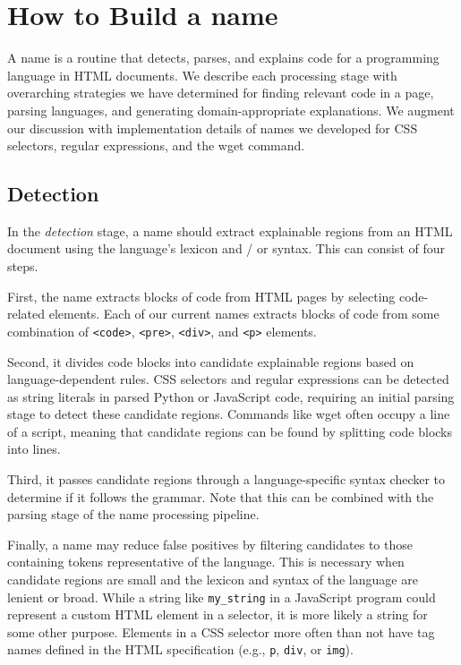 \section{How to Build a \Gls{name}}

A \Gls{name} is a routine that detects, parses, and explains code for a programming language in HTML documents.
We describe each processing stage with overarching strategies we have determined for finding relevant code in a page, parsing languages, and generating domain-appropriate explanations.
We augment our discussion with implementation details of \Glspl{name} we developed for CSS selectors, regular expressions, and the wget command.

\subsection{Detection}
In the \emph{detection} stage, a \Gls{name} should extract explainable regions from an HTML document using the language's lexicon and / or syntax.
This can consist of four steps.

First, the \Gls{name} extracts blocks of code from HTML pages by selecting code-related elements.
Each of our current \Glspl{name} extracts blocks of code from some combination of \texttt{<code>}, \texttt{<pre>}, \texttt{<div>}, and \texttt{<p>} elements.

Second, it divides code blocks into candidate explainable regions based on language-dependent rules.
CSS selectors and regular expressions can be detected as string literals in parsed Python or JavaScript code, requiring an initial parsing stage to detect these candidate regions.
Commands like wget often occupy a line of a script, meaning that candidate regions can be found by splitting code blocks into lines.

Third, it passes candidate regions through a language-specific syntax checker to determine if it follows the grammar.
Note that this can be combined with the parsing stage of the \Gls{name} processing pipeline.

Finally, a \Gls{name} may reduce false positives by filtering candidates to those containing tokens representative of the language.
This is necessary when candidate regions are small and the lexicon and syntax of the language are lenient or broad.
While a string like \texttt{\qs{}my\_string\qs{}} in a JavaScript program could represent a custom HTML element in a selector, it is more likely a string for some other purpose.
Elements in a CSS selector more often than not have tag names defined in the HTML specification (e.g., \texttt{p}, \texttt{div}, or \texttt{img}).

